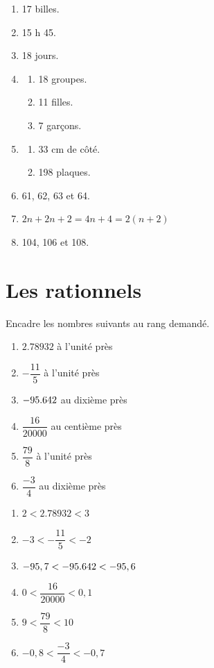 \begin{solution}
  \begin{enumerate}[cols=2]
    \item 17 billes.
    \item 15 h 45.
    \item 18 jours.
    \item
          \begin{enumerate}[label=\arabic*)]
            \item 18 groupes.
            \item 11 filles.
            \item 7 garçons.
          \end{enumerate}
    \item
          \begin{enumerate}[label=\arabic*)]
            \item 33 cm de côté.
            \item 198 plaques.
          \end{enumerate}
    \item 61, 62, 63 et 64.
    \item $2n + 2n + 2 = 4n + 4 = 2(n+2)$
    \item 104, 106 et 108.
  \end{enumerate}
\end{solution}

\newpage
\section{Les rationnels}

\begin{exercise}
  Encadre les nombres suivants au rang demandé.
  \begin{enumerate}[cols=2]
    \item $\num{2,78932}$ à l'unité près
    \item $- \dfrac{11}{5}$ à l'unité près
    \item $\num{- 95,642}$ au dixième près
    \item $\dfrac{16}{\num{20000}}$ au centième près
    \item $\dfrac{79}{8}$ à l'unité près
    \item $\dfrac{-3}{4}$ au dixième près
  \end{enumerate}
\end{exercise}
\begin{solution}
  \begin{enumerate}[cols=2]
    \item $2<\num{2,78932}<3$
    \item $-3<- \dfrac{11}{5}<-2$
    \item $-95,7 < \num{- 95,642} < -95,6$
    \item $0<\dfrac{16}{\num{20000}}<0,1$
    \item $9<\dfrac{79}{8}<10$
    \item $-0,8<\dfrac{-3}{4}<-0,7$
  \end{enumerate}
\end{solution}

